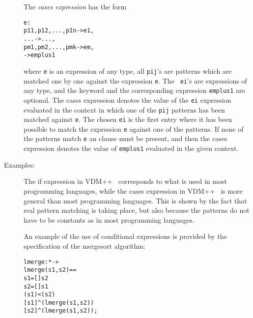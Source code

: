\documentclass[\pformat,12pt]{article}
\newcommand{\vdmslpp}[2]{%
#2
}
\newcommand{\vdmsl}{VDM-SL}
\newcommand{\vdmpp}{VDM++}
\begin{document}
\begin{description}
  The {\it cases expression} has the form
  \begin{alltt}
     e :
      p11, p12, ..., p1n -> e1,
      ...                -> ...,
      pm1, pm2, ..., pmk -> em,
                   -> emplus1
  \end{alltt}
  where {\tt e} is an expression of any type, all {\tt pij}'s are patterns
  which are matched one by one against the expression {\tt e}.  The {\tt
    ei}'s are expressions of any type, and the keyword  and
  the corresponding expression {\tt emplus1} are optional. The cases
  expression denotes the value of the {\tt ei} expression evaluated in the
  context in which one of the {\tt pij} patterns has been matched against
  {\tt e}. The chosen {\tt ei} is the first entry where it has been
  possible to match the expression {\tt e} against one of the patterns. If
  none of the patterns match {\tt e} an  clause must be
  present, and then the cases expression denotes the value of {\tt emplus1}
  evaluated in the given context.
     
\item[Examples:] The if expression in \vdmslpp{\vdmsl}{\vdmpp}\ 
  corresponds to what is used in most programming languages, while the
  cases expression in \vdmslpp{\vdmsl}{\vdmpp}\ is more general than
  most programming languages. This is shown by the fact that real
  pattern matching is taking place, but also because the patterns do not
  have to be constants as in most programming languages.

  An example of the use of conditional expressions is provided by the
  specification of the mergesort algorithm:
  \begin{alltt}
  lmerge :  *  -> 
  lmerge (s1,s2) ==
     s1 = []  s2
     s2 = []  s1
    \keyw{elseif} ( s1) < ( s2)
    \keyw{then} [ s1]\verb+^+(lmerge ( s1, s2))
    \keyw{else} [\keyw{hd} s2]\verb+^+(lmerge (s1, \keyw{tl} s2));


\end{alltt}
\end{description}
\end{document}
